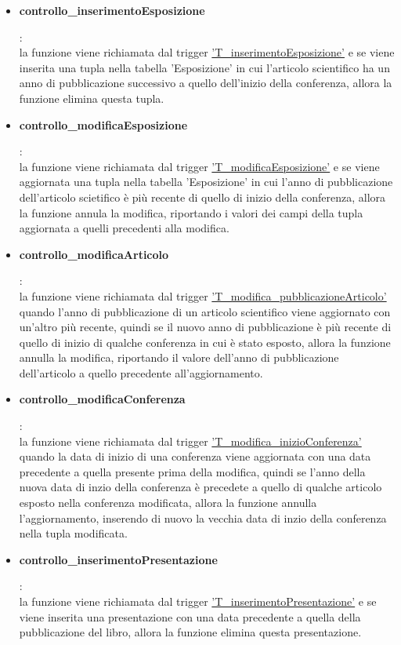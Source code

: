 \documentclass{article}
\begin{document}
\begin{itemize}
    \item \hypertarget{f11}{\textbf{controllo\_inserimentoEsposizione}}:\\
    la funzione viene richiamata dal trigger \hyperlink{t11}{'T\_inserimentoEsposizione'} e se viene inserita una tupla nella tabella 'Esposizione' in cui l'articolo scientifico ha un anno di pubblicazione successivo a quello dell'inizio della conferenza, allora la funzione elimina questa tupla.

    \item \hypertarget{f12}{\textbf{controllo\_modificaEsposizione}}:\\
    la funzione viene richiamata dal trigger \hyperlink{t12}{'T\_modificaEsposizione'} e se viene aggiornata una tupla nella tabella 'Esposizione' in cui l'anno di pubblicazione dell'articolo scietifico è più recente di quello di inizio della conferenza, allora la funzione annula la modifica, riportando i valori dei campi della tupla aggiornata a quelli precedenti alla modifica. 

    \item \hypertarget{f13}{\textbf{controllo\_modificaArticolo}}:\\
    la funzione viene richiamata dal trigger \hyperlink{t13}{'T\_modifica\_pubblicazioneArticolo'} quando l'anno di pubblicazione di un articolo scientifico viene aggiornato con un'altro più recente, quindi se il nuovo anno di pubblicazione è più recente di quello di inizio di qualche conferenza in cui è stato esposto, allora la funzione annulla la modifica, riportando il valore dell'anno di pubblicazione dell'articolo a quello precedente all'aggiornamento.

    \item \hypertarget{f14}{\textbf{controllo\_modificaConferenza}}:\\
    la funzione viene richiamata dal trigger \hyperlink{t14}{'T\_modifica\_inizioConferenza'} quando la data di inizio di una conferenza viene aggiornata con una data precedente a quella presente prima della modifica, quindi se l'anno della nuova data di inzio della conferenza è precedete a quello di qualche articolo esposto nella conferenza modificata, allora la funzione annulla l'aggiornamento, inserendo di nuovo la vecchia data di inzio della conferenza nella tupla modificata.

    \item \hypertarget{f15}{\textbf{controllo\_inserimentoPresentazione}}:\\
    la funzione viene richiamata dal trigger \hyperlink{t15}{'T\_inserimentoPresentazione'} e se viene inserita una presentazione con una data precedente a quella della pubblicazione del libro, allora la funzione elimina questa presentazione.


\end{itemize}
\end{document}
